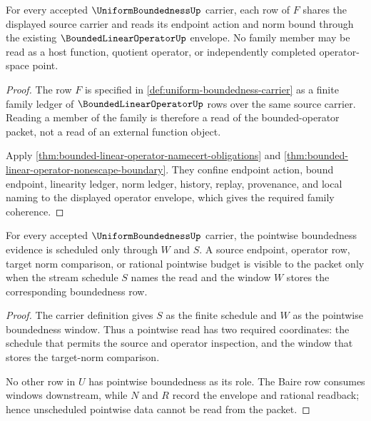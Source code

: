 \begin{theorem}
\label{thm:uniform-boundedness-family-coherence}
For every accepted $\UniformBoundednessUp$ carrier, each row of $F$ shares the displayed source carrier and reads its endpoint action and norm bound through the existing $\BoundedLinearOperatorUp$ envelope. No family member may be read as a host function, quotient operator, or independently completed operator-space point.
\end{theorem}
\begin{proof}
The row $F$ is specified in \autoref{def:uniform-boundedness-carrier} as a finite family ledger of $\BoundedLinearOperatorUp$ rows over the same source carrier. Reading a member of the family is therefore a read of the bounded-operator packet, not a read of an external function object.

Apply \autoref{thm:bounded-linear-operator-namecert-obligations} and \autoref{thm:bounded-linear-operator-nonescape-boundary}. They confine endpoint action, bound endpoint, linearity ledger, norm ledger, history, replay, provenance, and local naming to the displayed operator envelope, which gives the required family coherence.
\end{proof}

\begin{theorem}
\label{thm:uniform-boundedness-pointwise-window}
For every accepted $\UniformBoundednessUp$ carrier, the pointwise boundedness evidence is scheduled only through $W$ and $S$. A source endpoint, operator row, target norm comparison, or rational pointwise budget is visible to the packet only when the stream schedule $S$ names the read and the window $W$ stores the corresponding boundedness row.
\end{theorem}
\begin{proof}
The carrier definition gives $S$ as the finite schedule and $W$ as the pointwise boundedness window. Thus a pointwise read has two required coordinates: the schedule that permits the source and operator inspection, and the window that stores the target-norm comparison.

No other row in $U$ has pointwise boundedness as its role. The Baire row consumes windows downstream, while $N$ and $R$ record the envelope and rational readback; hence unscheduled pointwise data cannot be read from the packet.
\end{proof}

